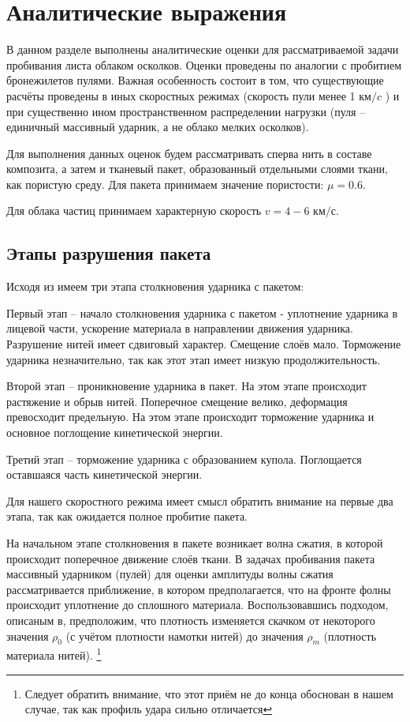 \chapter{Аналитические выражения}\label{ch:equations}

В данном разделе выполнены аналитические оценки для рассматриваемой задачи пробивания листа облаком осколков.
Оценки проведены по аналогии с пробитием бронежилетов пулями.
Важная особенность состоит в том, что существующие расчёты проведены в иных скоростных режимах (скорость пули менее
1 $км/c$ ) и при существенно ином пространственном распределении нагрузки (пуля -- единичный массивный ударник, а не облако мелких
осколков).

Для выполнения данных оценок будем рассматривать сперва нить в составе композита, а затем и тканевый пакет, 
образованный отдельными слоями ткани, как пористую среду. Для пакета принимаем значение пористости: $\mu=0.6$\cite{buzov2004}.

Для облака частиц принимаем характерную скорость $v=4-6$ $км/с$.

\section{Этапы разрушения пакета}\label{sec:destr-stages}
Исходя из\cite{kobylkin2014} имеем три этапа столкновения ударника с пакетом:

Первый этап -- начало столкновения ударника с пакетом - уплотнение ударника в лицевой части,
ускорение материала в направлении движения ударника.
Разрушение нитей имеет сдвиговый характер.
Смещение слоёв мало.
Торможение ударника незначительно, так как этот этап имеет низкую продолжительность.

Второй этап -- проникновение ударника в пакет.
На этом этапе происходит растяжение и обрыв нитей.
Поперечное смещение велико, деформация превосходит предельную.
На этом этапе происходит торможение ударника и основное поглощение кинетической энергии.

Третий этап -- торможение ударника с образованием купола.
Поглощается оставшаяся часть кинетической энергии.

Для нашего скоростного режима имеет смысл обратить внимание на первые два этапа, так как ожидается полное пробитие пакета.

На начальном этапе столкновения в пакете возникает волна сжатия, в которой происходит поперечное движение слоёв ткани.
В задачах пробивания пакета массивный ударником (пулей) для оценки амплитуды волны сжатия рассматривается приближение,
в котором предполагается, что на фронте фолны происходит уплотнение до сплошного материала.
Воспользовавшись подходом, описаным в\cite{kobylkin2014}, предположим, что плотность изменяется скачком от некоторого
значения $\rho_0$ (с учётом плотности намотки нитей) до значения $\rho_m$ (плотность материала нитей).
\footnote{Следует обратить внимание, что этот приём не до конца обоснован в нашем случае, так как профиль удара сильно
отличается}

